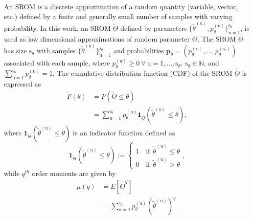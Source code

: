 An SROM is a discrete approximation of a random quantity (variable, vector, etc.) defined by a finite and generally small number of samples with varying probability. In this work, an SROM $\tilde{\Theta}$ defined by parameters $\{ \tilde{\theta}^{(\mathrm{u})}, p_{\theta}^{(\mathrm{u})} \}_{\mathrm{u}=1}^{\mathrm{s}_{\theta}}$, is used as low dimensional approximations of random parameter $\Theta$. The SROM $\tilde{\Theta}$ has size $\mathrm{s}_{\theta}$ with samples $\{ \tilde{\theta}^{(\mathrm{u})} \}_{\mathrm{u}=1}^{\mathrm{s}_{\theta}}$ and probabilities $\bm{p}_{\theta} = (p_{\theta}^{(\mathrm{u})}, \dots, p_{\theta}^{(\mathrm{s}_{\theta})})$ associated with each sample, where $p_{\theta}^{(\mathrm{u})} \geq 0 \ \forall\ \mathrm{u}=1,\dots,\mathrm{s}_{\theta},\ \mathrm{s}_{\theta}\in\mathbb{N}$, and $\sum_{\mathrm{u}=1}^{\mathrm{s}_{\theta}}  p_{\theta}^{(\mathrm{u})} = 1$. The cumulative distribution function (CDF) of the SROM $\tilde\Theta$ is expressed as 
\begin{align}
	\tilde{F}(\theta) &= P( \tilde{\Theta} \leq \theta) \nonumber \\
				&=  \sum_{\mathrm{u}=1}^{\mathrm{s}_{\theta}} p_{\theta}^{(\mathrm{u})} \bm{1}_{\tilde\Theta}\left(\tilde{\theta}^{(\mathrm{u})} \leq \theta\right), \label{srom_cdf}
\end{align}
where $\bm{1}_{\tilde\Theta}(\tilde{\theta}^{(\mathrm{u})} \leq \theta)$ is an indicator function defined as
\begin{equation} 
\bm{1}_{\tilde{\Theta}}(\tilde\theta^{(\mathrm{u})} \leq \theta):=
\begin{cases}
1 \quad \text{if}\ \ \tilde{\theta}^{(\mathrm{u})} \leq \theta \\
0 \quad \text{if}\ \ \tilde{\theta}^{(\mathrm{u})} > \theta
\end{cases},
\end{equation}
while $q^{th}$ order moments are given by
\begin{align}
	\tilde{\mu}(q) &= E\left[  \tilde{\Theta}^q \right] \nonumber \\
			 &= \sum_{\mathrm{u}=1}^{\mathrm{s}_{\theta}} p_{\theta}^{(\mathrm{u})} ( \tilde{\theta}^{(\mathrm{u})})^q. \label{srom_moments}
\end{align}
\vspace{3pt}
 
